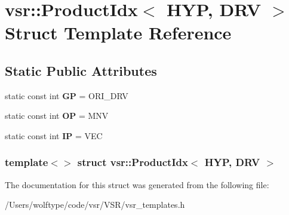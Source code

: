 \hypertarget{structvsr_1_1_product_idx_3_01_h_y_p_00_01_d_r_v_01_4}{\section{vsr\-:\-:Product\-Idx$<$ H\-Y\-P, D\-R\-V $>$ Struct Template Reference}
\label{structvsr_1_1_product_idx_3_01_h_y_p_00_01_d_r_v_01_4}
}
\subsection*{Static Public Attributes}
\begin{DoxyCompactItemize}
\item 
\hypertarget{structvsr_1_1_product_idx_3_01_h_y_p_00_01_d_r_v_01_4_aba1e98b321377b861e06cee21b7ea93c}{static const int {\bfseries G\-P} = O\-R\-I\-\_\-\-D\-R\-V}\label{structvsr_1_1_product_idx_3_01_h_y_p_00_01_d_r_v_01_4_aba1e98b321377b861e06cee21b7ea93c}

\item 
\hypertarget{structvsr_1_1_product_idx_3_01_h_y_p_00_01_d_r_v_01_4_a1f56332ea92b8bcce4e760ab25ed2b65}{static const int {\bfseries O\-P} = M\-N\-V}\label{structvsr_1_1_product_idx_3_01_h_y_p_00_01_d_r_v_01_4_a1f56332ea92b8bcce4e760ab25ed2b65}

\item 
\hypertarget{structvsr_1_1_product_idx_3_01_h_y_p_00_01_d_r_v_01_4_a27f43a9bbbcb7e7b0e0318daa6d3c96a}{static const int {\bfseries I\-P} = V\-E\-C}\label{structvsr_1_1_product_idx_3_01_h_y_p_00_01_d_r_v_01_4_a27f43a9bbbcb7e7b0e0318daa6d3c96a}

\end{DoxyCompactItemize}
\subsubsection*{template$<$$>$ struct vsr\-::\-Product\-Idx$<$ H\-Y\-P, D\-R\-V $>$}



The documentation for this struct was generated from the following file\-:\begin{DoxyCompactItemize}
\item 
/\-Users/wolftype/code/vsr/\-V\-S\-R/vsr\-\_\-templates.\-h\end{DoxyCompactItemize}
